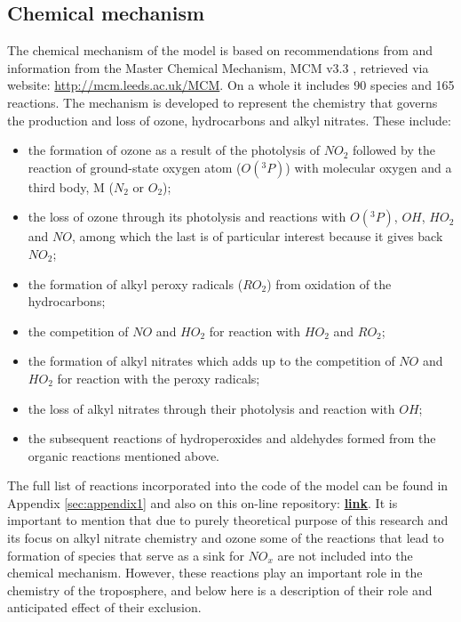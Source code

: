 \documentclass[11pt,a4paper]{article}
\begin{document}
\subsection{Chemical mechanism}\label{sec:method_chem}
The chemical mechanism of the model is based on recommendations from \citep{Atkinson2004} and information from the Master Chemical Mechanism, MCM v3.3 \citep{Jenkin1997,Saunders2003}, retrieved via website: \href{http://mcm.leeds.ac.uk/MCM}{http://mcm.leeds.ac.uk/MCM}. On a whole it includes 90 species and 165 reactions. The mechanism is developed to represent the chemistry that governs the production and loss of ozone, hydrocarbons and alkyl nitrates. These include:
\begin{itemize}
\item the formation of ozone as a result of the photolysis of $NO_2$ followed by the reaction of ground-state oxygen atom ($O(^3P)$) with molecular oxygen and a third body, M ($N_2$ or $O_2$);
\item the loss of ozone through its photolysis and reactions with $O(^3P)$, $OH$, $HO_2$ and $NO$, among which the last is of particular interest because it gives back $NO_2$;
\item the formation of alkyl peroxy radicals ($RO_2$) from oxidation of the hydrocarbons;
\item the competition of $NO$ and $HO_2$ for reaction with $HO_2$ and $RO_2$;
\item the formation of alkyl nitrates which adds up to the competition of $NO$ and $HO_2$ for reaction with the peroxy radicals;
\item the loss of alkyl nitrates through their photolysis and reaction with $OH$;
\item the subsequent reactions of hydroperoxides and aldehydes formed from the organic reactions mentioned above.
\end{itemize}
The full list of reactions incorporated into the code of the model can be found in Appendix \ref{sec:appendix1} and also on this on-line repository: \href{https://github.com/justmeteomary4/ENV-MB4X_model}{\textbf{link}}. It is important to mention that due to purely theoretical purpose of this research and its focus on alkyl nitrate chemistry and ozone some of the reactions that lead to formation of species that serve as a sink for $NO_x$ are not included into the chemical mechanism. However, these reactions play an important role in the chemistry of the troposphere, and below here is a description of their role and anticipated effect of their exclusion.
\end{document}
